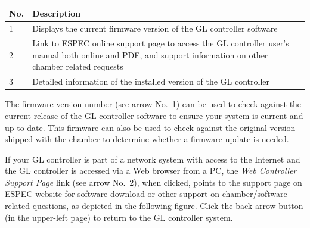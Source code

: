 \begin{longtable}[]{@{}ll@{}}
\toprule
\begin{minipage}[b]{0.13\columnwidth}\raggedright
No.\strut
\end{minipage} & \begin{minipage}[b]{0.81\columnwidth}\raggedright
Description\strut
\end{minipage}\tabularnewline
\midrule
\endhead
\begin{minipage}[t]{0.13\columnwidth}\raggedright
1\strut
\end{minipage} & \begin{minipage}[t]{0.81\columnwidth}\raggedright
Displays the current firmware version of the GL controller
software\strut
\end{minipage}\tabularnewline
\begin{minipage}[t]{0.13\columnwidth}\raggedright
2\strut
\end{minipage} & \begin{minipage}[t]{0.81\columnwidth}\raggedright
Link to ESPEC online support page to access the GL controller user's
manual both online and PDF, and support information on other chamber
related requests\strut
\end{minipage}\tabularnewline
\begin{minipage}[t]{0.13\columnwidth}\raggedright
3\strut
\end{minipage} & \begin{minipage}[t]{0.81\columnwidth}\raggedright
Detailed information of the installed version of the GL controller\strut
\end{minipage}\tabularnewline
\bottomrule
\end{longtable}

The firmware version number (see arrow No.~1) can be used to check
against the current release of the GL controller software to ensure your
system is current and up to date. This firmware can also be used to
check against the original version shipped with the chamber to determine
whether a firmware update is needed.

If your GL controller is part of a network system with access to the
Internet and the GL controller is accessed via a Web browser from a PC,
the \emph{Web Controller Support Page} link (see arrow No.~2), when
clicked, points to the support page on ESPEC website for software
download or other support on chamber/software related questions, as
depicted in the following figure. Click the back-arrow button (in the
upper-left page) to return to the GL controller system.

